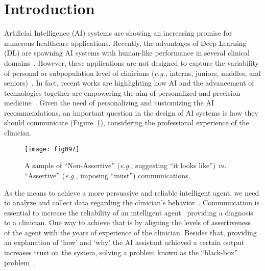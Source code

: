 \clearpage
\label{chap:chap006}

\section{Introduction}
\label{sec:chap006001}

Artificial Intelligence (AI) systems are showing an increasing promise for numerous healthcare applications.
Recently, the advantages of Deep Learning (DL) are spawning AI systems with human-like performance in several clinical domains~\cite{CALISTO2022102285, Hannun2019, Ruamviboonsuk2019, Stephansen2018}.
However, these applications are not designed to capture the variability of personal or subpopulation level of clinicians ({\it e.g.}, interns, juniors, middles, and seniors)~\cite{Uddin2019}.
In fact, recent works are highlighting how AI and the advancement of technologies together are empowering the aim of personalized and precision medicine~\cite{Subramanian2020, HO2020497, Wetzstein2020}.
Given the need of personalizing and customizing the AI recommendations, an important question in the design of AI systems is how they should communicate (Figure~\ref{fig:fig097}), considering the professional experience of the clinician.

\begin{figure}
\texttt{[image: fig097]}
\caption[]{A sample of ``Non-Assertive'' ({\it e.g.}, suggesting ``it looks like'') {\it vs.} ``Assertive'' ({\it e.g.}, imposing ``must'') communications.}
\label{fig:fig097}
\end{figure}

As the means to achieve a more persuasive and reliable intelligent agent, we need to analyze and collect data regarding the clinician's behavior~\cite{PELAU2021106855}.
Communication is essential to increase the reliability of an intelligent agent~\cite{10.1145/3311350.3347162} providing a diagnosis to a clinician.
One way to achieve that is by aligning the levels of assertiveness~\cite{pacheco2019alignment} of the agent with the years of experience of the clinician.
Besides that, providing an explanation of `how' and `why' the AI assistant achieved a certain output increases trust on the system, solving a problem known as the ``black-box'' problem~\cite{10.1145/3491102.3502104, CALISTO2021102607}.

